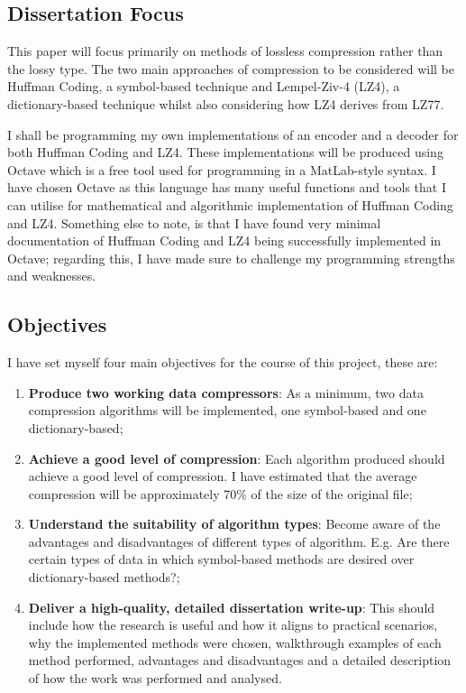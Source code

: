 \documentclass[12pt]{article}
\begin{document}
\subsection{Dissertation Focus}
This paper will focus primarily on methods of lossless compression rather than the lossy type. The two main approaches of compression to be considered will be Huffman Coding, a symbol-based technique and Lempel-Ziv-4 (LZ4), a dictionary-based technique whilst also considering how LZ4 derives from LZ77. 

I shall be programming my own implementations of an encoder and a decoder for both Huffman Coding and LZ4. These implementations will be produced using Octave which is a free tool used for programming in a MatLab-style syntax. I have chosen Octave as this language has many useful functions and tools that I can utilise for mathematical and algorithmic implementation of Huffman Coding and LZ4. Something else to note, is that I have found very minimal documentation of Huffman Coding and LZ4 being successfully implemented in Octave; regarding this, I have made sure to challenge my programming strengths and weaknesses.

\subsection{Objectives}{\label{sec_objectives}}
I have set myself four main objectives for the course of this project, these are:

\begin{enumerate}
	\item \textbf{Produce two working data compressors}: As a minimum, two data compression algorithms will be implemented, one symbol-based and one dictionary-based;
	
	\item \textbf{Achieve a good level of compression}: Each algorithm produced should achieve a good level of compression. I have estimated that the average compression will be approximately 70\% of the size of the original file;
	
	\item \textbf{Understand the suitability of algorithm types}: Become aware of the advantages and disadvantages of different types of algorithm. E.g. Are there certain types of data in which symbol-based methods are desired over dictionary-based methods?;
	
	\item \textbf{Deliver a high-quality, detailed dissertation write-up}: This should include how the research is useful and how it aligns to practical scenarios, why the implemented methods were chosen, walkthrough examples of each method performed, advantages and disadvantages and a detailed description of how the work was performed and analysed.
\end{enumerate}
\end{document}
